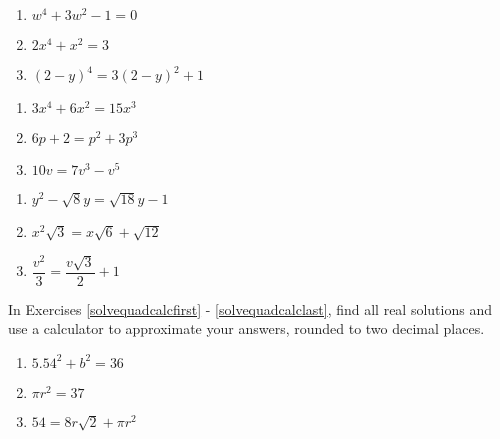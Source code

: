 \documentclass[11pt]{article}
\theoremstyle{definition}  %
\newcounter{HW}
\begin{document}
\begin{multicols}{3}
\begin{enumerate}
\setcounter{enumi}{\value{HW}}

\item $w^4 + 3w^2 - 1 = 0$
\item $2x^4 +x^2 = 3$ 
\item $(2-y)^4 = 3(2-y)^2 + 1$

\setcounter{HW}{\value{enumi}}
\end{enumerate}
\end{multicols}

\begin{multicols}{3}
\begin{enumerate}
\setcounter{enumi}{\value{HW}}

\item $3x^4 + 6x^2 = 15x^3$
\item $6p + 2 = p^2 + 3p^3$
\item $10v = 7v^3 - v^5$

\setcounter{HW}{\value{enumi}}
\end{enumerate}
\end{multicols}



\begin{multicols}{3}
\begin{enumerate}
\setcounter{enumi}{\value{HW}}

\item $y^2 - \sqrt{8} y = \sqrt{18} y - 1$
\item $x^2 \sqrt{3} = x \sqrt{6} + \sqrt{12}$
\item $\dfrac{v^2}{3} = \dfrac{v \sqrt{3}}{2} + 1$ \label{solvequadlast}

\setcounter{HW}{\value{enumi}}
\end{enumerate}
\end{multicols}

In Exercises \ref{solvequadcalcfirst} - \ref{solvequadcalclast}, find all real solutions and use a calculator to approximate your answers, rounded to two decimal places.

\begin{multicols}{3}
\begin{enumerate}
\setcounter{enumi}{\value{HW}}

\item $5.54^2 + b^2 = 36$\label{solvequadcalcfirst}
\item $\pi r^2 = 37$ 
\item $54 = 8r\sqrt{2} + \pi r^2$


\setcounter{HW}{\value{enumi}}
\end{enumerate}
\end{multicols}
\end{document}
